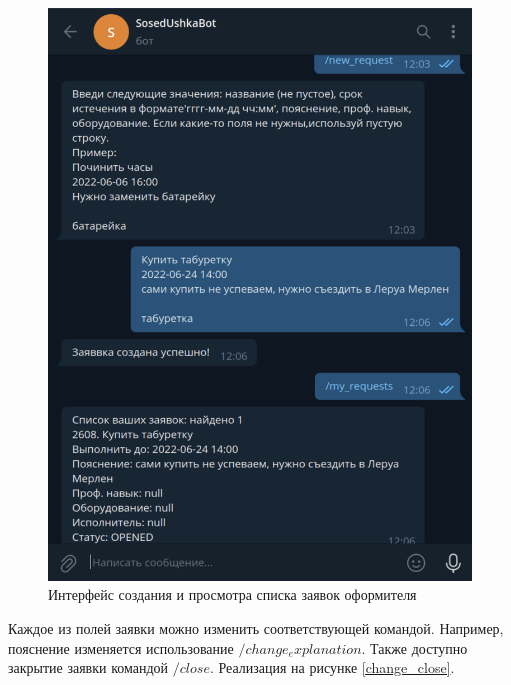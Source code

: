 \begin{figure}[H]
	\begin{center}
		\includegraphics[page=1,scale=0.4]{assets/customer.pdf}
	\end{center}
	\caption{Интерфейс создания и просмотра списка заявок оформителя}
	\label{customer}
\end{figure}

Каждое из полей заявки можно изменить соответствующей командой. Например, пояснение изменяется использование $/change_explanation$. Также доступно закрытие заявки командой $/close$. Реализация на рисунке \ref{change_close}.

